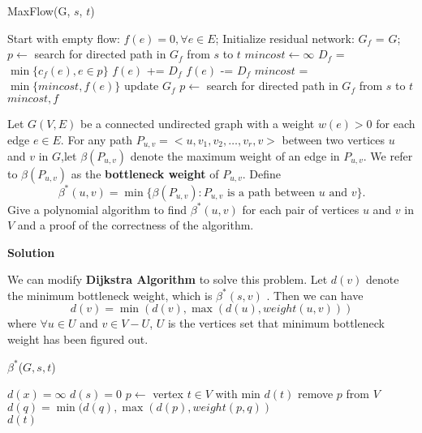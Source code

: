 \documentclass{article}
\newcounter{exercise}
\newcommand{\<}{
    \langle}
\renewcommand{\>}{
    \rangle}
\begin{document}
{\begin{algorithm}[htb]
\caption{MaxFlow(G, $s$, $t$)}
\begin{algorithmic}[1]
\State Start with empty flow: $f(e) = 0, \forall{e \in E}$;
\State Initialize residual network: $G_f$ = $G$;
\State $p \leftarrow$ search for directed path in $G_f$ from $s$ to $t$
\State $mincost \leftarrow \infty$
    \State $D_f$ = $\min\{c_f(e), e \in p\}$
    \State $f(e)$ += $D_f$
    \EndIf
    \State $f(e)$ -= $D_f$
    \EndIf
    \State $mincost$ = $\min\{mincost, f(e)\}$
    \EndFor
    \State update $G_f$
    \State $p \leftarrow$ search for directed path in $G_f$ from $s$ to $t$
\EndWhile \\
\Return $mincost, f$
\end{algorithmic}
\end{algorithm}


\begin{exercise}
Let $G(V,E)$ be a connected undirected graph with a weight $w(e)>0$ for each edge $e\in E$. For any path $P_{u,v}=<u,v_1,v_2,\ldots,v_r,v>$ between two vertices $u$ and $v$ in $G$,let $\beta(P_{u,v})$ denote the maximum weight of an edge in $P_{u,v}$. We refer to $\beta(P_{u,v})$ as the \textbf{bottleneck weight} of $P_{u,v}$. Define
\begin{displaymath}
\beta^*(u,v)=\min\{\beta(P_{u,v}):P_{u,v}\text{ is a path between $u$ and $v$}\}.
\end{displaymath}
Give a polynomial algorithm to find $\beta^*(u,v)$ for each pair of vertices $u$ and $v$ in $V$ and a proof of the correctness of the algorithm.
\end{exercise}

\bigskip
\noindent \textbf{Solution}

We can modify \textbf{Dijkstra Algorithm} to solve this problem. Let $d(v)$ denote the minimum bottleneck weight, which is $\beta^*(s, v)$ . Then we can have
$$
d(v) = \min(d(v), \max(d(u), weight(u, v)))
$$
where $\forall{u \in U}$ and $v \in V-U$, $U$ is the vertices set that minimum bottleneck weight has been figured out.

\newpage

\begin{algorithm}[htb]
\caption{$\beta^{*}$($G,s,t$)}
\begin{algorithmic}[1]
    \State $d(x) = \infty$
\EndFor
\State $d(s) = 0$
    \State $p \leftarrow $ vertex $t \in V$ with min $d(t)$
    \State remove $p$ from $V$
        \State $d(q) = \min(d(q), \max(d(p), weight(p, q))$
    \EndFor
\EndWhile \\
\Return $d(t)$
\end{algorithmic}
\end{algorithm}

}
\end{document}
